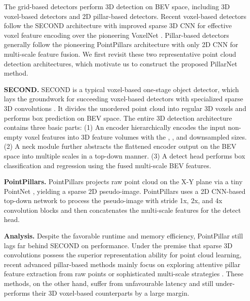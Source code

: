 \documentclass[runningheads]{llncs}
\begin{document}
The grid-based detectors perform 3D detection on BEV space, including 3D voxel-based detectors and 2D pillar-based detectors.
Recent voxel-based detectors follow the SECOND \cite{yan2018second} architecture with improved sparse 3D CNN for effective voxel feature encoding over the pioneering VoxelNet \cite{zhou2018voxelnet}.
Pillar-based detectors generally follow the pioneering PointPillars \cite{lang2019pointpillars} architecture with only 2D CNN for multi-scale feature fusion.
We first revisit these two representative point cloud detection architectures, which motivate us to construct the proposed PillarNet method.

{\flushleft \bf SECOND.} SECOND \cite{yan2018second} is a typical voxel-based one-stage object detector, which lays the groundwork for succeeding voxel-based detectors with specialized sparse 3D convolutions \cite{graham20183d,graham2017submanifold}.
It divides the unordered point cloud into regular 3D voxels and performs box prediction on BEV space.
The entire 3D detection architecture contains three basic parts: 
(1) An encoder hierarchically encodes the input non-empty voxel features into 3D feature volumes with the , ,  and  downsampled sizes.
(2) A neck module further abstracts the flattened encoder output on the BEV space into multiple scales in a top-down manner.
(3) A detect head performs box classification and regression using the fused multi-scale BEV features.

{\flushleft \bf PointPillars.}
PointPillars \cite{lang2019pointpillars} projects raw point cloud on the X-Y plane via a tiny PointNet \cite{qi2017pointnet}, yielding a sparse 2D pseudo-image. 
PointPillars uses a 2D CNN-based top-down network to process the pseudo-image with stride 1x, 2x, and 4x convolution blocks and then  concatenates the multi-scale features for the detect head.

{\flushleft \bf Analysis.}
Despite the favorable runtime and memory efficiency, PointPillar  \cite{lang2019pointpillars} still lags far behind SECOND \cite{yan2018second} on performance.
Under the premise that sparse 3D convolutions possess the superior representation ability for point cloud learning, recent advanced pillar-based methods mainly focus on exploring attentive pillar feature extraction \cite{liu2020tanet,ye2020hvnet} from raw points or sophisticated multi-scale strategies \cite{wang2019voxel,ye2020hvnet,noh2021hvpr}. These methods, on the other hand, suffer from unfavourable latency and still under-performs their 3D voxel-based counterparts by a large margin.
\end{document}
